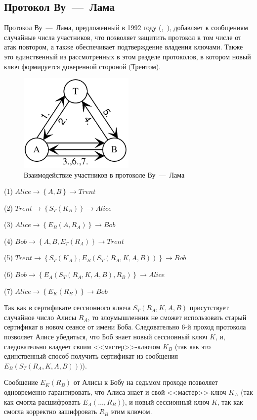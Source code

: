 \subsection{Протокол Ву~---~Лама}\label{section-woo-lam}

Протокол Ву~---~Лама, предложенный в 1992 году (,~\cite{Woo:Lam:1992:1, Woo:Lam:1992:3}), добавляет к сообщениям случайные числа участников, что позволяет защитить протокол в том числе от атак повтором, а также обеспечивает подтверждение владения ключами. Также это единственный из рассмотренных в этом разделе протоколов, в котором новый ключ формируется доверенной стороной (Трентом).

\begin{figure}
    \centering
    \includegraphics[width=0.5\textwidth]{pic/woo-lam}
    \caption{Взаимодействие участников в протоколе Ву~---~Лама\label{fig:woo-lam}}
\end{figure}

\begin{protocol}
    \item[(1)] $Alice \to \left\{ A, B \right\} \to Trent$
    \item[(2)] $Trent \to \left\{ S_T( K_B ) \right\} \to Alice$
    \item[(3)] $Alice \to \left\{ E_B ( A, R_A ) \right\} \to Bob$
    \item[(4)] $Bob \to \left\{ A, B, E_T( R_A ) \right\} \to Trent$
    \item[(5)] $Trent \to \left\{ S_T( K_A ), E_B ( S_T ( R_A, K, A, B ) ) \right\} \to Bob$
    \item[(6)] $Bob \to \left\{ E_A (S_T (R_A, K, A, B), R_B) \right\} \to Alice$
    \item[(7)] $Alice \to \left\{ E_K( R_B ) \right\} \to Bob$
\end{protocol}

Так как в сертификате сессионного ключа $S_T (R_A, K, A, B)$ присутствует случайное число Алисы $R_A$, то злоумышленник не сможет использовать старый сертификат в новом сеансе от имени Боба. Следовательно 6-й проход протокола позволяет Алисе убедиться, что Боб знает новый сессионный ключ $K$, и, следовательно владеет своим <<мастер>>-ключом $K_B$ (так как это единственный способ получить сертификат из сообщения $E_B ( S_T ( R_A, K, A, B ) ))$).

Сообщение $E_K( R_B )$ от Алисы к Бобу на седьмом проходе позволяет одновременно гарантировать, что Алиса знает и свой <<мастер>>-ключ $K_A$ (так как смогла расшифровать $E_A(\dots, R_B)$), и новый сессионный ключ $K$, так как смогла корректно зашифровать $R_B$ этим ключом.

